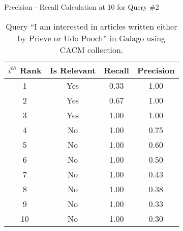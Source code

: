 \begin{table}[!htbp]
	\caption{Precision - Recall Calculation at 10 for Query \#2} \label{tab:rank2cal}
	\begin{center}
	\vspace{-5mm}
		\begin{tabular}{ c | c | c | c}
			\toprule
			\textit{$i^{th}$} Rank & Is Relevant & Recall & Precision\\
			\midrule
			1 & Yes & 0.33 & 1.00\\
			2 & Yes & 0.67 & 1.00\\
			3 & Yes & 1.00 & 1.00\\
			4 & No & 1.00 & 0.75\\
			5 & No & 1.00 & 0.60\\
			6 & No & 1.00 & 0.50\\
			7 & No & 1.00 & 0.43\\
			8 & No & 1.00 & 0.38\\
			9 & No & 1.00 & 0.33\\
			10 & No & 1.00 & 0.30\\
			\bottomrule
		\end{tabular}
	\caption*{\scriptsize Query ``I am interested in articles written either by Prieve or Udo Pooch'' in Galago using CACM collection.}
	 \end{center}
\end{table}
